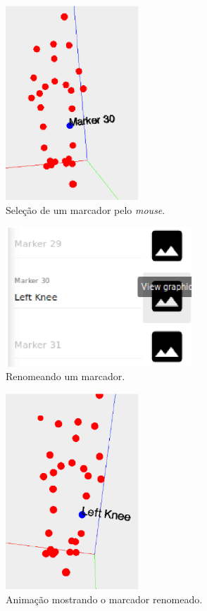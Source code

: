 \begin{figure}[ht]
	\centering
	\includegraphics[width=5cm]{figuras/tela20.eps}
	\caption{Seleção de um marcador pelo \emph{mouse}.}
\label{tela20}
\end{figure}

\begin{figure}[ht]
	\centering
	\includegraphics[width=7cm]{figuras/tela21.eps}
	\caption{Renomeando um marcador.}
\label{tela21}
\end{figure}



\begin{figure}[ht]
	\centering
	\includegraphics[width=5cm]{figuras/tela22.eps}
	\caption{Animação mostrando o marcador renomeado.}
\label{tela22}

\end{figure}


